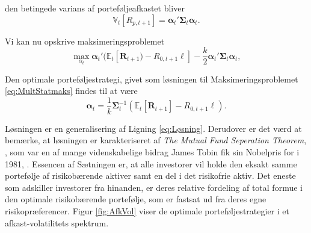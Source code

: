 \documentclass[
  a4paper,
  oneside]{memoir}
\begin{document}
den betingede varians af porteføljeafkastet bliver
\begin{equation}
\mathbb{V}_t[R_{p,t+1}]=\bm{\alpha}_t'\bm{\Sigma}_t\bm{\alpha}_t.
\end{equation}

Vi kan nu opskrive maksimeringsproblemet
\begin{equation}
\max_{\alpha_t} \bm{\alpha}_t'(\mathbb{E}_t[\bm{R}_{t+1})- R_{0,t+1}\bm{\ell}] - \frac{k}{2}\bm{\alpha}_t'\bm{\Sigma}_t\bm{\alpha}_t, \label{eq:MultStatmaks}
\end{equation}

Den optimale porteføljestrategi, givet som løsningen til Maksimeringsproblemet \eqref{eq:MultStatmaks} findes til at være
\begin{equation}
\bm{\alpha}_t=\frac{1}{k}\bm{\Sigma}_t^{-1}(\mathbb{E}_t[\bm{R}_{t+1}]-R_{0,t+1}\bm{\ell}).\label{eq:Multalpha}
\end{equation}

Løsningen er en generalisering af Ligning \eqref{eq:Løsning}. Derudover er det værd at bemærke, at løsningen er karakteriseret af \textit{The Mutual Fund Seperation Theorem}, \citep{Tobin1958}, som var en af mange videnskabelige bidrag James Tobin fik sin Nobelpris for i 1981, \citep{Nobel2020}. Essencen af Sætningen er, at alle investorer vil holde den eksakt samme portefølje af risikobærende aktiver samt en del i det risikofrie aktiv. Det eneste som adskiller investorer fra hinanden, er deres relative fordeling af total formue i den optimale risikobærende portefølje, som er fastsat ud fra deres egne risikopræferencer. Figur \ref{fig:AfkVol} viser de optimale porteføljestrategier i et afkast-volatilitets spektrum.
\end{document}
